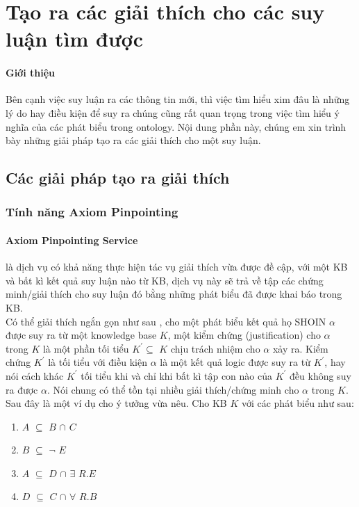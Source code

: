 \section{Tạo ra các giải thích cho các suy luận tìm được}
\paragraph{Giới thiệu} Bên cạnh việc suy luận ra các thông tin mới, thì việc tìm hiểu xim đâu là những lý do hay điều kiện để suy ra chúng cũng rất quan trọng trong việc tìm hiểu ý nghĩa của các phát biểu trong ontology. Nội dung phần này, chúng em xin trình bày những giải pháp tạo ra các giải thích cho một suy luận.
\subsection{Các giải pháp tạo ra giải thích}
\subsubsection{Tính năng Axiom Pinpointing}
\paragraph{Axiom Pinpointing Service} là dịch vụ có khả năng thực hiện tác vụ giải thích vừa được đề cập, với một KB và bất kì kết quả suy luận nào từ KB, dịch vụ này sẽ trả về tập các chứng minh/giải thích cho suy luận đó bằng những phát biểu đã được khai báo trong KB.
\\
\hspace*{0.05\textwidth} Có thể giải thích ngắn gọn như sau \cite[p.~2]{axiomPinpoint}, cho một phát biểu kết quả họ SHOIN $\alpha$ được suy ra từ một knowledge base $K$, một kiểm chứng (justification) cho $\alpha$  trong $K$ là một phần tối tiểu $K^{'}\subseteq$ $K$ chịu trách nhiệm cho $\alpha$ xảy ra. Kiểm chứng $K^{'}$ là tối tiểu với điều kiện $\alpha$ là một kết quả logic được suy ra từ $K^{'}$, hay nói cách khác $K^{'}$ tối tiểu khi và chỉ khi bất kì tập con nào của $K^{'}$ đều không suy ra được $\alpha$. Nói chung có thể tồn tại nhiều giải thích/chứng minh cho $\alpha$ trong $K$. Sau đây là một ví dụ cho ý tưởng vừa nêu. Cho KB $K$ với các phát biểu như sau:
\begin{enumerate}
	\item	$A$ $\subseteq$ $B$ $\cap$ $C$ 
	\item	$B$ $\subseteq$ $\neg$ $E$
	\item	$A$ $\subseteq$ $D$ $\cap$ $\exists$ $R.E$ 
	\item	$D$ $\subseteq$ $C$ $\cap$ $\forall$ $R.B$
\end{enumerate}

